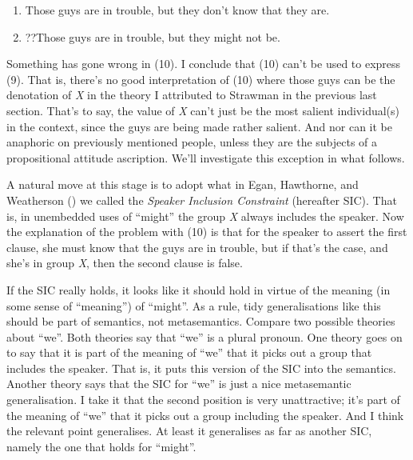 \documentclass[
  11pt,
  letterpaper,
  DIV=11,
  numbers=noendperiod,
  twoside]{scrartcl}
\providecommand{\tightlist}{%
  \setlength{\itemsep}{0pt}\setlength{\parskip}{0pt}}
\begin{document}
\begin{enumerate}
\def\labelenumi{\arabic{enumi}.}
\setcounter{enumi}{8}
\tightlist
\item
  Those guys are in trouble, but they don't know that they are.
\item
  ??Those guys are in trouble, but they might not be.
\end{enumerate}

Something has gone wrong in (10). I conclude that (10) can't be used to
express (9). That is, there's no good interpretation of (10) where those
guys can be the denotation of \emph{X} in the theory I attributed to
Strawman in the previous last section. That's to say, the value of
\emph{X} can't just be the most salient individual(s) in the context,
since the guys are being made rather salient. And nor can it be
anaphoric on previously mentioned people, unless they are the subjects
of a propositional attitude ascription. We'll investigate this exception
in what follows.

A natural move at this stage is to adopt what in Egan, Hawthorne, and
Weatherson () we called the
\emph{Speaker Inclusion Constraint} (hereafter SIC). That is, in
unembedded uses of ``might'' the group \emph{X} always includes the
speaker. Now the explanation of the problem with (10) is that for the
speaker to assert the first clause, she must know that the guys are in
trouble, but if that's the case, and she's in group \emph{X}, then the
second clause is false.

If the SIC really holds, it looks like it should hold in virtue of the
meaning (in some sense of ``meaning'') of ``might''. As a rule, tidy
generalisations like this should be part of semantics, not
metasemantics. Compare two possible theories about ``we''. Both theories
say that ``we'' is a plural pronoun. One theory goes on to say that it
is part of the meaning of ``we'' that it picks out a group that includes
the speaker. That is, it puts this version of the SIC into the
semantics. Another theory says that the SIC for ``we'' is just a nice
metasemantic generalisation. I take it that the second position is very
unattractive; it's part of the meaning of ``we'' that it picks out a
group including the speaker. And I think the relevant point generalises.
At least it generalises as far as another SIC, namely the one that holds
for ``might''.
\end{document}
